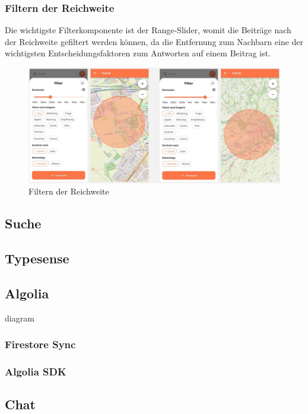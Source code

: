 \subsubsection{Filtern der Reichweite}

Die wichtigste Filterkomponente ist der Range-Slider, womit die Beiträge nach der Reichweite gefiltert werden können, da die Entfernung zum Nachbarn eine der wichtigsten Entscheidungsfaktoren zum Antworten auf einem Beitrag ist.

\begin{figure}[h]
  \centering
  \includegraphics[width=\textwidth]{pics/range-filter.JPG}
  \caption{Filtern der Reichweite}
\end{figure}

\subsection{Suche}
\subsection{Typesense}
\subsection{Algolia}
diagram
\subsubsection{Firestore Sync}

\subsubsection{Algolia SDK}


\subsection{Chat}




